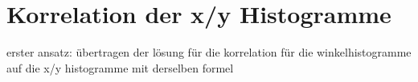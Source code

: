 \section{Korrelation der x/y Histogramme}

erster ansatz: übertragen der lösung für die korrelation für die winkelhistogramme auf die x/y histogramme mit derselben formel